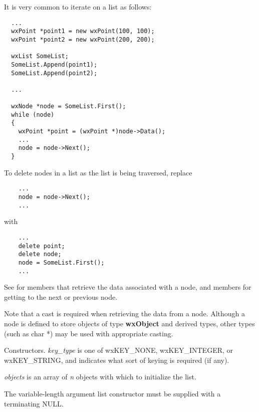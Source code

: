 It is very common to iterate on a list as follows:

\begin{verbatim}
  ...
  wxPoint *point1 = new wxPoint(100, 100);
  wxPoint *point2 = new wxPoint(200, 200);

  wxList SomeList;
  SomeList.Append(point1);
  SomeList.Append(point2);

  ...

  wxNode *node = SomeList.First();
  while (node)
  {
    wxPoint *point = (wxPoint *)node->Data();
    ...
    node = node->Next();
  }
\end{verbatim}

To delete nodes in a list as the list is being traversed, replace

\begin{verbatim}
    ...
    node = node->Next();
    ...
\end{verbatim}

with

\begin{verbatim}
    ...
    delete point;
    delete node;
    node = SomeList.First();
    ...
\end{verbatim}

See  for members that retrieve the data associated with a node, and
members for getting to the next or previous node.

Note that a cast is required when retrieving the data from a node.  Although a
node is defined to store objects of type {\bf wxObject} and derived types, other
types (such as char *) may be used with appropriate casting.






Constructors. {\it key\_type} is one of wxKEY\_NONE, wxKEY\_INTEGER, or wxKEY\_STRING,
and indicates what sort of keying is required (if any).

{\it objects} is an array of {\it n} objects with which to initialize the list.

The variable-length argument list constructor must be supplied with a
terminating NULL.


